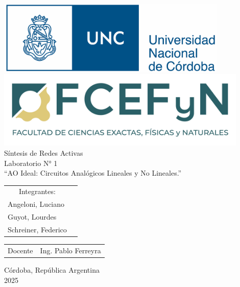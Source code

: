 \documentclass{report}
\begin{document}
\begin{titlepage}
    

\thispagestyle{empty}


	\begin{center}
  	  \includegraphics[width=11cm]{img/unc_logo.png} 
	\vspace{10pt}
 	   \includegraphics[width=12cm]{img/fcefyn_logo.png}
   	 \\[1cm]
  	  \vspace{5pt}
	 \LARGE Síntesis de Redes Activas\\[0.6cm] 
 	    \large Laboratorio N° 1
	    \\[0.8cm]
	    \large “AO Ideal: Circuitos Analógicos Lineales y No Lineales.”
 	   \\[0.2cm]
  	  \vspace{50pt}
	    \begin{table}[!h]
    
  	  \centering
  	  \begin{tabular}{ll}
 	   \multicolumn{1}{c}{Integrantes:} \\
	    Angeloni, Luciano\\
	    Guyot, Lourdes \\
	    Schreiner, Federico
	    \end{tabular}
 	   \end{table}
	    \vspace{20pt}
	    \begin{table}[!h]
 	   \centering
    
	    \begin{tabular}{ll}
	    \multicolumn{1}{c}{Docente} & Ing. Pablo Ferreyra
	    \end{tabular}
	    \end{table}
	    \vfill
 	   Córdoba, República Argentina\\
	    2025\\
	\end{center}

	\end{titlepage}
\end{document}

